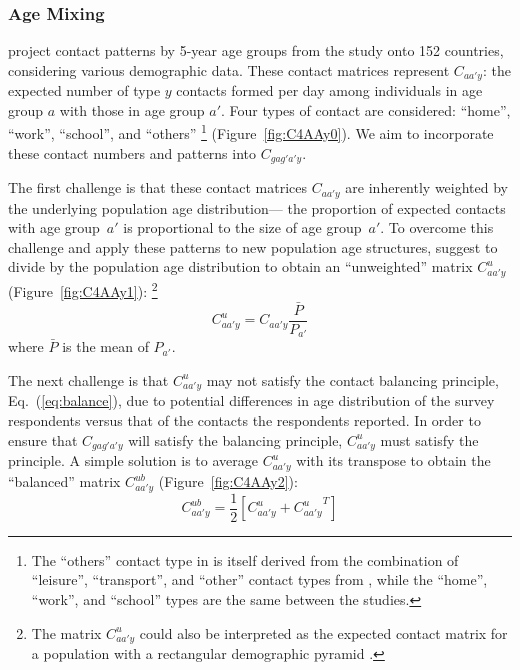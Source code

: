 \subsubsection{Age Mixing}\label{meth.prop.mix.age}
\citet{Prem2017} project contact patterns by 5-year age groups
from the \polymod study \cite{Mossong2008} onto 152 countries,
considering various demographic data.
These contact matrices represent $C_{aa'y}$:
the expected number of type $y$ contacts formed per day among
individuals in age group $a$ with those in age group $a'$.
Four types of contact are considered: ``home'', ``work'', ``school'', and ``others''%
\footnote{The ``others'' contact type in \cite{Prem2017} is itself derived from
  the combination of ``leisure'', ``transport'', and ``other'' contact types from \cite{Mossong2008},
  while the ``home'', ``work'', and ``school'' types are the same between the studies.}
(Figure~\ref{fig:C4AAy0}).
We aim to incorporate these contact numbers and patterns into $C_{gag'a'y}$.
\par
The first challenge is that these contact matrices $C_{aa'y}$ are
inherently weighted by the underlying population age distribution---%
the proportion of expected contacts with age group~$a'$ is proportional to the size of age group~$a'$.
To overcome this challenge and apply these patterns to new population age structures, 
\citet{Arregui2018} suggest to divide by the population age distribution
to obtain an ``unweighted'' matrix $C^u_{aa'y}$ (Figure~\ref{fig:C4AAy1}):%
\footnote{The matrix $C^u_{aa'y}$ could also be interpreted as
  the expected contact matrix for a population with a rectangular demographic pyramid \cite{Arregui2018}.}
\begin{equation}\label{eq:C^u}
  C^u_{aa'y} = C_{aa'y} \frac{\bar{P}}{P_{a'}}
\end{equation}
where $\bar{P}$ is the mean of $P_{a'}$.
\par
The next challenge is that $C^u_{aa'y}$ may not satisfy
the contact balancing principle, Eq.~(\ref{eq:balance}),
due to potential differences in age distribution of
the \polymod survey respondents versus that of the contacts the respondents reported.
In order to ensure that $C_{gag'a'y}$ will satisfy the balancing principle,
$C^u_{aa'y}$ must satisfy the principle.
A simple solution is to average $C^u_{aa'y}$ with its transpose
to obtain the ``balanced'' matrix $C^{ub}_{aa'y}$ (Figure~\ref{fig:C4AAy2}):
\begin{equation}\label{eq:C^ub}
  C^{ub}_{aa'y} = \frac{1}{2}\left[C^u_{aa'y} + {C^u_{aa'y}}^{T}\right]
\end{equation}
